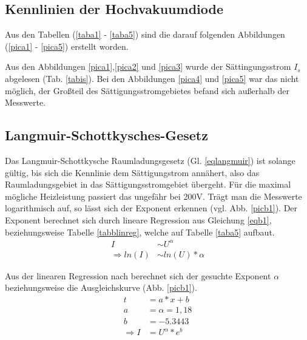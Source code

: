 \subsection{Kennlinien der Hochvakuumdiode} 
Aus den Tabellen (\ref{taba1} - \ref{taba5}) sind die darauf folgenden 
Abbildungen (\ref{pica1} - \ref{pica5}) erstellt worden.
    
     
Aus den Abbildungen \ref{pica1},\ref{pica2} und \ref{pica3} wurde der Sättingungsstrom 
$I_s$ abgelesen (Tab. \ref{tabis}). Bei den Abbildungen \ref{pica4} und \ref{pica5} war das 
nicht möglich, der Großteil des Sättigungsstromgebietes befand sich außerhalb der 
Messwerte.

\FloatBarrier
\subsection{Langmuir-Schottkysches-Gesetz}
Das Langmuir-Schottkysche Raumladungsgesetz (Gl. \ref{eqlangmuir}) ist solange gültig, bis sich die Kennlinie
dem Sättigungstrom annähert, also das Raumladungsgebiet in das Sättigungsstromgebiet 
übergeht. Für die maximal mögliche Heizleistung passiert das ungefähr bei 200V.
Trägt man die Messwerte logarithmisch auf, so lässt sich der Exponent erkennen (vgl. 
Abb. \ref{picb1}). Der Exponent berechnet sich durch lineare Regression \cite{linreg}
aus Gleichung \ref{eqb1}, beziehungsweise Tabelle \ref{tabblinreg}, welche auf Tabelle \ref{taba5} aufbaut.
\begin{align}
I&\sim U^\alpha \\
\Rightarrow ln(I)&\sim ln(U)*\alpha \label{eqb1}
\end{align}

\FloatBarrier
Aus der linearen Regression nach \cite{linreg} berechnet sich der gesuchte Exponent $\alpha$ beziehungsweise die Ausgleichskurve (Abb. \ref{picb1}).
\begin{align}
t&=a*x+b \\
a&=\alpha=1,18 \label{exalpha}\\
b&=-5.3443 \\
\Rightarrow I&=U^\alpha*e^b 
\end{align}

\FloatBarrier
